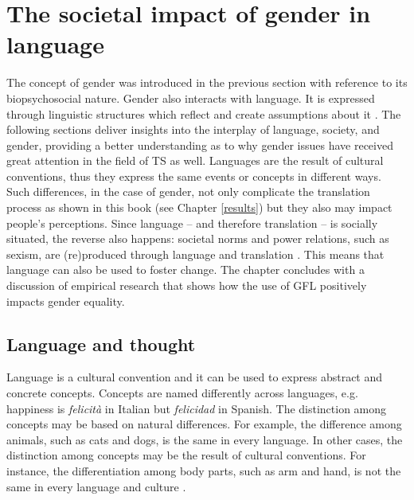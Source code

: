 \section{The societal impact of gender in language} \label{sec:powerlanguage}

The concept of gender was introduced in the previous section with reference to its biopsychosocial nature. Gender also interacts with language. It is expressed through linguistic structures which reflect and create assumptions about it \citep{stahlberg2007representation}. The following sections deliver insights into the interplay of language, society, and gender, providing a better understanding as to why gender issues have received great attention in the field of TS as well. Languages are the result of cultural conventions, thus they express the same events or concepts in different ways. Such differences, in the case of gender, not only complicate the translation process as shown in this book (see Chapter \ref{results}) but they also may impact people's perceptions. Since language -- and therefore translation \citep{wolf2007sociology} -- is socially situated, the reverse also happens: societal norms and power relations, such as sexism, are (re)produced through language and translation \citep{simon1996gender,von2016translation}. This means that language can also be used to foster change. The chapter concludes with a discussion of empirical research that shows how the use of GFL positively impacts gender equality. 

\subsection{Language and thought} \label{sec:languageculture}
Language is a cultural convention \citep[9f]{deutscher2010through} and it can be used to express abstract and concrete concepts. Concepts are named differently across languages, e.g. happiness is \textit{felicità} in Italian but \textit{felicidad} in Spanish. The distinction among concepts may be based on natural differences. For example, the difference among animals, such as cats and dogs, is the same in every language. In other cases, the distinction among concepts may be the result of cultural conventions. For instance, the differentiation among body parts, such as arm and hand, is not the same in every language and culture \citep[13]{deutscher2010through}. 

